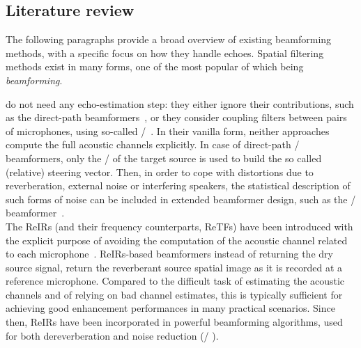 \subsection{Literature review}
The following paragraphs provide a broad overview of existing beamforming methods, with a specific focus on how they handle echoes.
Spatial filtering methods exist in many forms, one of the most popular of which being \textit{beamforming}.

 do not need any echo-estimation step:
they either ignore their contributions, such as the direct-path beamformers~, or they consider coupling filters between pairs of microphones, using so-called \ReIRdef/~.
In their vanilla form, neither approaches compute the full acoustic channels explicitly.
In case of direct-path \DStxtdef/ beamformers, only the \DOA/ of the target source is used to build the so called (relative) steering vector.
Then, in order to cope with distortions due to reverberation, external noise or interfering speakers, the statistical description of such forms of noise can be included in extended beamformer design, such as the \MVDRtxt/ beamformer~.
\\The \acp{ReIR} (and their frequency counterparts, \acp{ReTF}) have been introduced with the explicit purpose of avoiding the computation of the acoustic channel related to each microphone~.
\acp{ReIR}-based beamformers instead of returning the dry source signal, return the reverberant source spatial image as it is recorded at a reference microphone.
Compared to the difficult task of estimating the acoustic channels and of relying on bad channel estimates, this is typically sufficient for achieving good enhancement performances in many practical scenarios.
Since then, \acp{ReIR} have been incorporated in powerful beamforming algorithms, used for both dereverberation and noise reduction (\eg/ ).

